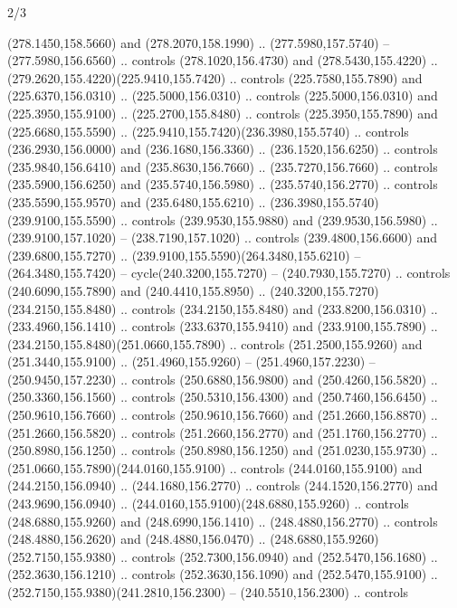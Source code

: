 \begin{flagdescription}{2/3}
\begin{scope}[xshift=0.5\flaglength,yshift=0.5\flagwidth,scale=\flagwidth/259.2]
\begin{scope}[y=0.8pt, x=0.8pt, yscale=-1,shift={(-243,-162)}]
      (278.1450,158.5660) and (278.2070,158.1990) .. (277.5980,157.5740) --
      (277.5980,156.6560) .. controls (278.1020,156.4730) and (278.5430,155.4220) ..
      (279.2620,155.4220)(225.9410,155.7420) .. controls (225.7580,155.7890) and
      (225.6370,156.0310) .. (225.5000,156.0310) .. controls (225.5000,156.0310) and
      (225.3950,155.9100) .. (225.2700,155.8480) .. controls (225.3950,155.7890) and
      (225.6680,155.5590) .. (225.9410,155.7420)(236.3980,155.5740) .. controls
      (236.2930,156.0000) and (236.1680,156.3360) .. (236.1520,156.6250) .. controls
      (235.9840,156.6410) and (235.8630,156.7660) .. (235.7270,156.7660) .. controls
      (235.5900,156.6250) and (235.5740,156.5980) .. (235.5740,156.2770) .. controls
      (235.5590,155.9570) and (235.6480,155.6210) ..
      (236.3980,155.5740)(239.9100,155.5590) .. controls (239.9530,155.9880) and
      (239.9530,156.5980) .. (239.9100,157.1020) -- (238.7190,157.1020) .. controls
      (239.4800,156.6600) and (239.6800,155.7270) ..
      (239.9100,155.5590)(264.3480,155.6210) -- (264.3480,155.7420) --
      cycle(240.3200,155.7270) -- (240.7930,155.7270) .. controls
      (240.6090,155.7890) and (240.4410,155.8950) ..
      (240.3200,155.7270)(234.2150,155.8480) .. controls (234.2150,155.8480) and
      (233.8200,156.0310) .. (233.4960,156.1410) .. controls (233.6370,155.9410) and
      (233.9100,155.7890) .. (234.2150,155.8480)(251.0660,155.7890) .. controls
      (251.2500,155.9260) and (251.3440,155.9100) .. (251.4960,155.9260) --
      (251.4960,157.2230) -- (250.9450,157.2230) .. controls (250.6880,156.9800) and
      (250.4260,156.5820) .. (250.3360,156.1560) .. controls (250.5310,156.4300) and
      (250.7460,156.6450) .. (250.9610,156.7660) .. controls (250.9610,156.7660) and
      (251.2660,156.8870) .. (251.2660,156.5820) .. controls (251.2660,156.2770) and
      (251.1760,156.2770) .. (250.8980,156.1250) .. controls (250.8980,156.1250) and
      (251.0230,155.9730) .. (251.0660,155.7890)(244.0160,155.9100) .. controls
      (244.0160,155.9100) and (244.2150,156.0940) .. (244.1680,156.2770) .. controls
      (244.1520,156.2770) and (243.9690,156.0940) ..
      (244.0160,155.9100)(248.6880,155.9260) .. controls (248.6880,155.9260) and
      (248.6990,156.1410) .. (248.4880,156.2770) .. controls (248.4880,156.2620) and
      (248.4880,156.0470) .. (248.6880,155.9260)(252.7150,155.9380) .. controls
      (252.7300,156.0940) and (252.5470,156.1680) .. (252.3630,156.1210) .. controls
      (252.3630,156.1090) and (252.5470,155.9100) ..
      (252.7150,155.9380)(241.2810,156.2300) -- (240.5510,156.2300) .. controls

\end{scope}
\end{scope}
\end{flagdescription}
